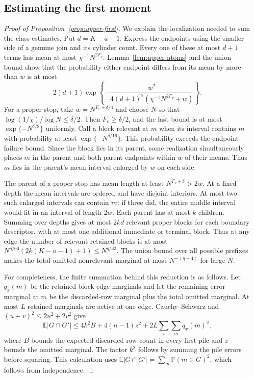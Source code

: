 \documentclass[11pt]{article}
\numberwithin{equation}{section}
\theoremstyle{definition}
\theoremstyle{remark}
\newcommand{\E}{\mathbb E}
\newcommand{\Pp}{\mathbb P}
\newcommand{\1}{\mathbf 1}
\begin{document}
\subsection{Estimating the first moment}
\begin{proof}[Proof of Proposition~\ref{prop:upper-first}]
We explain the localization needed to sum the class estimates.
Put $d=K-a-1$. Express the endpoints using the smaller side of a
genuine join and its cylinder count. Every one of these at most
$d+1$ terms has mean at most $\chi^{-1}N^{2F_v}$.
Lemma~\ref{lem:upper-atoms} and the union bound show that the
probability either endpoint differs from its mean by more than $w$
is at most
\[
 2(d+1)\exp\left\{-\frac{w^2}
                {4(d+1)^2(\chi^{-1}N^{2F_v}+w)}\right\}.
\]
For a proper stop, take $w=N^{F_v+\delta/4}$ and choose $N$ so that
$\log(1/\chi)/\log N\le\delta/2$. Then $F_v\ge\delta/2$,
and the last bound is at most $\exp\{-N^{\delta/8}\}$ uniformly.
Call a block relevant at $m$ when its interval contains $m$ with
probability at least $\exp\{-N^{\delta/16}\}$. This probability
exceeds the endpoint failure bound. Since the block lies in its
parent, some realization simultaneously places $m$ in the parent
and both parent endpoints within $w$ of their means. Thus $m$ lies
in the parent's mean interval enlarged by $w$ on each side.

The parent of a proper stop has mean length at least
$N^{F_v+\delta}>2w$. At a fixed depth the mean intervals are
ordered and have disjoint interiors. At most two such enlarged
intervals can contain $m$: if three did, the entire middle interval
would fit in an interval of length $2w$. Each parent has at most
$k$ children. Summing over depths gives at most $2kd$ relevant
proper blocks for each boundary descriptor, with at most one
additional immediate or terminal block. Thus at any edge the number of relevant retained
blocks is at most
$N^{\eta/64}(2k(K-a-1)+1)\le N^{\eta/32}$.
The union bound over all possible prefixes makes the total omitted
nonrelevant marginal at most $N^{-(\eta+4)}$ for large $N$.

For completeness, the finite summation behind this reduction is as
follows. Let $q_x(m)$ be the retained-block edge marginals and let
the remaining error marginal at $m$ be the discarded-row marginal
plus the total omitted marginal. At most $L$ retained marginals are
active at one edge. Cauchy--Schwarz and $(u+v)^2\le2u^2+2v^2$ give
\[
 \E|G\cap G'|
 \le4k^2 B+4(n-1)z^2+2L\sum_x\sum_m q_x(m)^2,
\]
where $B$ bounds the expected discarded-row count in every first
pile and $z$ bounds the omitted marginal. The factor $k^2$ follows
by summing the pile errors before squaring. This calculation uses
$\E|G\cap G'|=\sum_m\Pp(m\in G)^2$, which follows from independence.


\end{proof}
\end{document}
